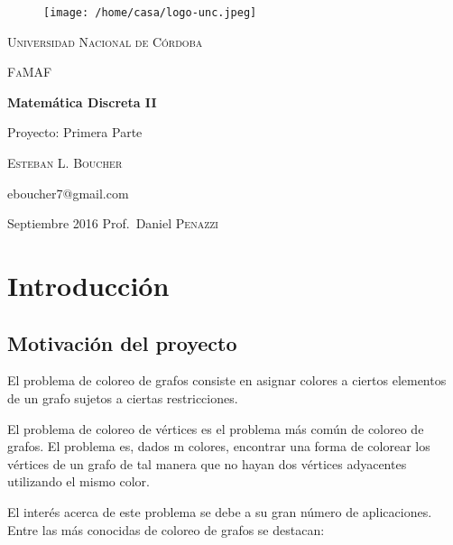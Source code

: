 \documentclass[11pt,a4paper]{article}
\theoremstyle{plain}
\begin{document}
\begin{titlepage}
	\centering

	\begin{figure}[htp]
	\centering
	\texttt{[image: /home/casa/logo-unc.jpeg]}
	\end{figure}
	
	{\scshape\Large\textsc{Universidad Nacional de Córdoba} \par}
	\vspace{0.5cm}
	{\scshape\large FaMAF\par}
	\vspace{1.5cm}

	{\LARGE\bfseries Matemática Discreta II\par}
	\vspace{.7cm}
	{\Large Proyecto: Primera Parte\par}
	\vspace{3cm}
	{\Large\scshape{Esteban L. Boucher}\par}
	\vspace{.4cm}
	{\large\ttfamily eboucher7@gmail.com\par}
	\vspace{.4cm}
	{\large Septiembre 2016}
	\vfill
	Prof.~Daniel \textsc{Penazzi}

	\date{Septiembre, 2016}
\end{titlepage}

\renewcommand\refname{}

\renewcommand{\contentsname}{Índice general}

\tableofcontents
\newpage
\section{Introducción}

	\subsection{Motivación del proyecto}

 El problema de coloreo de grafos consiste en asignar colores a ciertos elementos de un grafo sujetos a ciertas restricciones.

 El problema de coloreo de vértices es el problema más común de coloreo de grafos. El problema es, dados m colores, encontrar una forma de colorear los vértices de un grafo de tal manera que no hayan dos vértices adyacentes utilizando el mismo color.
 
 El interés acerca de este problema se debe a su gran número de aplicaciones. Entre las más conocidas de coloreo de grafos se destacan\cite {1}:
 
\end{document}
